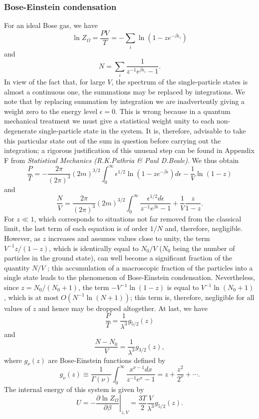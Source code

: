 \subsubsection{Bose-Einstein condensation}
For an ideal Bose gas, we have
\[\ln Z_{\Omega} = \frac{PV}{T} = - \sum_i \ln (1 - ze^{-\beta \epsilon_i})\] 
and 
\[N =\sum_i \frac{1}{z^{-1}e^{\beta \epsilon_i}-1}.\]
In view of the fact that, for large $V$, the spectrum of the single-particle states is almost a continuous one, the summations may be replaced by integrations. 
We note that by replacing summation by integration we are inadvertently giving a weight zero to the energy level $\epsilon = 0$. This is wrong because in a quantum mechanical treatment we must give a statistical weight unity to each non-degenerate single-particle state in the system. It is, therefore, advisable to take this particular state out of the sum in question before carrying out the integration; a rigorous justification of this unusual step can be found in Appendix F from \emph{Statistical Mechanics (R.K.Pathria \& Paul D.Beale)}.
We thus obtain
\[\frac{P}{T} = -\frac{2\pi}{(2\pi)^3}(2m)^{3/2}\int_0^{\infty} \epsilon^{1/2} \ln (1 - ze^{-\beta \epsilon}) d\epsilon  - \frac{1}{V}\ln(1-z)\]
and
\[\frac{N}{V} = \frac{2\pi}{(2\pi)^3}(2m)^{3/2}\int_0^{\infty} \frac{\epsilon^{1/2}  d\epsilon}{z^{-1}e^{\beta \epsilon}-1} +  \frac{1}{V}\frac{z}{1-z} .\]
For $z \ll 1$, which corresponds to situations not far removed from the classical limit, the last term of each equation is of order $1/N$ and, therefore, negligible. 
However, as $z$ increases and assumes values close to unity, the term $V^{-1}z/(1-z)$, which is identically equal to $N_0/V$ ($N_0$ being the number of particles in the ground state), can well become a significant fraction of the quantity $N/V$ ; this accumulation of a macroscopic fraction of the particles into a single state leads to the phenomenon of Bose-Einstein condensation. 
Nevertheless, since $z = N_0/(N_0+1)$, the term $-V^{-1}\ln (1-z)$ is equal to $V^{-1}\ln(N_0+1)$, which is at most $O(N^{-1}\ln(N+1))$; this term is, therefore, negligible for all values of $z$ and hence may be dropped altogether.
At last, we have
\[\frac{P}{T} = \frac{1}{\lambda^3}g_{5/2}(z)\]
and
\[\frac{N-N_0}{V} = \frac{1}{\lambda^3} g_{3/2}(z),\] 
where $g_{\nu}(z)$ are Bose-Einstein functions defined by
\[g_{\nu}(z) \equiv \frac{1}{\Gamma(\nu)} \int_{0}^{\infty} \frac{x^{\nu-1}dx}{z^{-1}e^x -1} = z + \frac{z^2}{2^{\nu}} + \cdots.\]
The internal energy of this system is given by
\[U = - \left. \frac{\partial \ln Z_{\Omega}}{\partial \beta} \right|_{z,V} = \frac{3T}{2} \frac{V}{\lambda^3} g_{5/2}(z).\]
